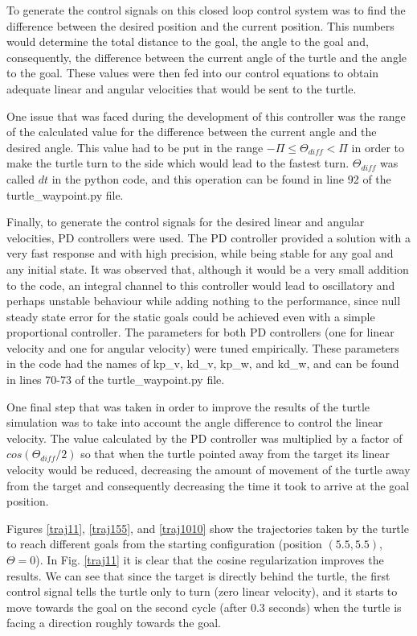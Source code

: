 \documentclass[a4paper, 10pt, conference]{ieeeconf}
\begin{document}
To generate the control signals on this closed loop control system was to find the difference between the desired position and the current position. This numbers would determine the total distance to the goal, the angle to the goal and, consequently, the difference between the current angle of the turtle and the angle to the goal. These values were then fed into our control equations to obtain adequate linear and angular velocities that would be sent to the turtle.

One issue that was faced during the development of this controller was the range of the calculated value for the difference between the current angle and the desired angle. This value had to be put in the range $-\Pi \leq \Theta_{diff} < \Pi$ in order to make the turtle turn to the side which would lead to the fastest turn. $\Theta_{diff}$ was called $dt$ in the python code, and this operation can be found in line 92 of the turtle\_waypoint.py file.

Finally, to generate the control signals for the desired linear and angular velocities, PD controllers were used. The PD controller provided a solution with a very fast response and with high precision, while being stable for any goal and any initial state. It was observed that, although it would be a very small addition to the code, an integral channel to this controller would lead to oscillatory and perhaps unstable behaviour while adding nothing to the performance, since null steady state error for the static goals could be achieved even with a simple proportional controller. The parameters for both PD controllers (one for linear velocity and one for angular velocity) were tuned empirically. These parameters in the code had the names of kp\_v, kd\_v, kp\_w, and kd\_w, and can be found in lines 70-73 of the turtle\_waypoint.py file.

One final step that was taken in order to improve the results of the turtle simulation was to take into account the angle difference to control the linear velocity. The value calculated by the PD controller was multiplied by a factor of $cos(\Theta_{diff}/2)$ so that when the turtle pointed away from the target its linear velocity would be reduced, decreasing the amount of movement of the turtle away from the target and consequently decreasing the time it took to arrive at the goal position.

Figures \ref{traj11}, \ref{traj155}, and \ref{traj1010} show the trajectories taken by the turtle to reach different goals from the starting configuration (position $(5.5,5.5)$, $\Theta = 0$). In Fig. \ref{traj11} it is clear that the cosine regularization improves the results. We can see that since the target is directly behind the turtle, the first control signal tells the turtle only to turn (zero linear velocity), and it starts to move towards the goal on the second cycle (after 0.3 seconds) when the turtle is facing a direction roughly towards the goal.
\end{document}
